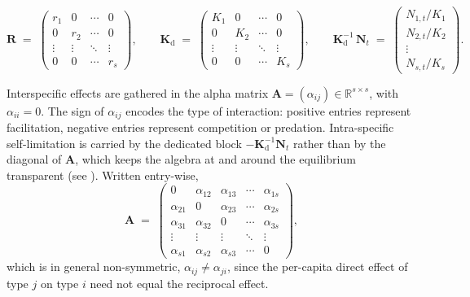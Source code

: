 \documentclass[12pt]{article}
\begin{document}
\begin{equation*}
	\mathbf{R} \;=\; \begin{pmatrix} r_{1} & 0 & \cdots & 0 \\ 0 & r_{2} & \cdots & 0 \\ \vdots & \vdots & \ddots & \vdots \\ 0 & 0 & \cdots & r_{s} \end{pmatrix},\qquad
	\mathbf{K}_{\mathrm{d}} \;=\; \begin{pmatrix} K_{1} & 0 & \cdots & 0 \\ 0 & K_{2} & \cdots & 0 \\ \vdots & \vdots & \ddots & \vdots \\ 0 & 0 & \cdots & K_{s} \end{pmatrix},\qquad
	\mathbf{K}_{\mathrm{d}}^{-1}\,\mathbf{N}_{t} \;=\; \begin{pmatrix} N_{1,t}/K_{1} \\ N_{2,t}/K_{2} \\ \vdots \\ N_{s,t}/K_{s} \end{pmatrix}.
\end{equation*}

Interspecific effects are gathered in the alpha matrix $\mathbf{A}=(\alpha_{ij})\in\mathbb{R}^{s\times s}$, with $\alpha_{ii}=0$. The sign of $\alpha_{ij}$ encodes the type of interaction: positive entries represent facilitation, negative entries represent competition or predation. Intra-specific self-limitation is carried by the dedicated block $-\mathbf{K}_{\mathrm{d}}^{-1}\mathbf{N}_{t}$ rather than by the diagonal of $\mathbf{A}$, which keeps the algebra at and around the equilibrium transparent (see \citep{Levins1968,Ranta2006,Novak2016}). Written entry-wise,
\begin{equation*}
	\mathbf{A} \;=\; \begin{pmatrix}
		0 & \alpha_{12} & \alpha_{13} & \cdots & \alpha_{1s} \\
		\alpha_{21} & 0 & \alpha_{23} & \cdots & \alpha_{2s} \\
		\alpha_{31} & \alpha_{32} & 0 & \cdots & \alpha_{3s} \\
		\vdots & \vdots & \vdots & \ddots & \vdots \\
		\alpha_{s1} & \alpha_{s2} & \alpha_{s3} & \cdots & 0
	\end{pmatrix},
\end{equation*}
which is in general non-symmetric, $\alpha_{ij}\neq\alpha_{ji}$, since the per-capita direct effect of type $j$ on type $i$ need not equal the reciprocal effect.
\end{document}
